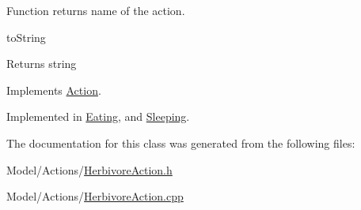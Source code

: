 Function returns name of the action. 

to\+String \begin{DoxyReturn}{Returns}
string 
\end{DoxyReturn}


Implements \hyperlink{class_action_a752a31c122f369e92c3e09cdc1a6d617}{Action}.



Implemented in \hyperlink{class_eating_a78e402536e59efec5e4643ffe0b4fd5a}{Eating}, and \hyperlink{class_sleeping_a7a9f89f9febd753e6eb99618cb714440}{Sleeping}.



The documentation for this class was generated from the following files\+:\begin{DoxyCompactItemize}
\item 
Model/\+Actions/\hyperlink{_herbivore_action_8h}{Herbivore\+Action.\+h}\item 
Model/\+Actions/\hyperlink{_herbivore_action_8cpp}{Herbivore\+Action.\+cpp}\end{DoxyCompactItemize}
